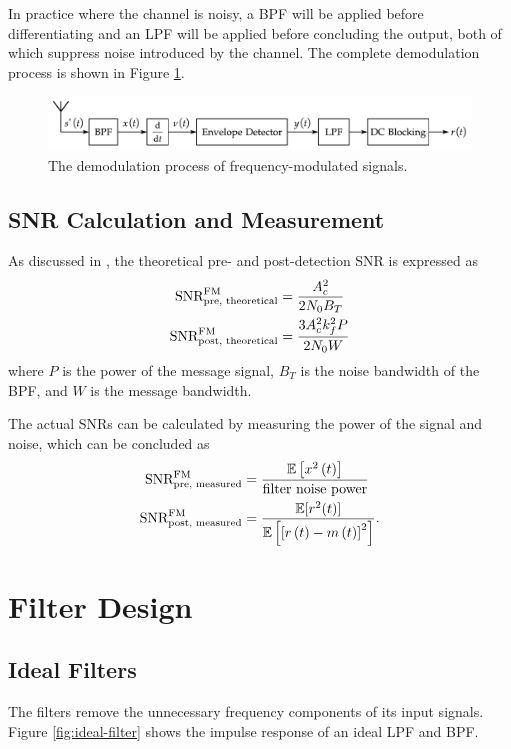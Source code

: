 \documentclass[../ECE459FinalProjectReport.tex]{subfiles}
\begin{document}
In practice where the channel is noisy, a BPF will be applied before differentiating and an LPF will be applied before concluding the output, both of which suppress noise introduced by the channel. The complete demodulation process is shown in Figure \ref{fig:fm-demod}.
\begin{figure}[tb]
    \centering
    \includegraphics[scale=0.7]{plots/fm_demod.pdf}
    \caption{The demodulation process of frequency-modulated signals.}
    \label{fig:fm-demod}
\end{figure}

\subsection{SNR Calculation and Measurement}
As discussed in \cite[Sec. 9.7]{haykinIntroductionAnalogDigital2007}, the theoretical pre- and post-detection SNR is expressed as
\begin{align}
    \text{SNR}_{\text{pre, theoretical}}^{\text{FM}} &= \frac{A_c^2}{2N_0B_T}\\
    \text{SNR}_{\text{post, theoretical}}^{\text{FM}} &= \frac{3A_c^2 k_f^2 P}{2N_0 W}
\end{align}
where $P$ is the power of the message signal, $B_T$ is the noise bandwidth of the BPF, and $W$ is the message bandwidth. %

The actual SNRs can be calculated by measuring the power of the signal and noise, which can be concluded as
\begin{align}
    \text{SNR}_{\text{pre, measured}}^{\text{FM}} &= \frac{\mathbb{E}\left[x^2\left(t\right)\right]}{\text{filter noise power}}\\
    \text{SNR}_{\text{post, measured}}^{\text{FM}} &= \frac{\mathbb{E}[r^2(t)]}{\mathbb{E}\left[ \left[ r\left(t\right) - m\left(t\right) \right]^2 \right]}.
\end{align}

\section{Filter Design}
\subsection{Ideal Filters}
The filters remove the unnecessary frequency components of its input signals. Figure \ref{fig:ideal-filter} shows the impulse response of an ideal LPF and BPF.
\end{document}
